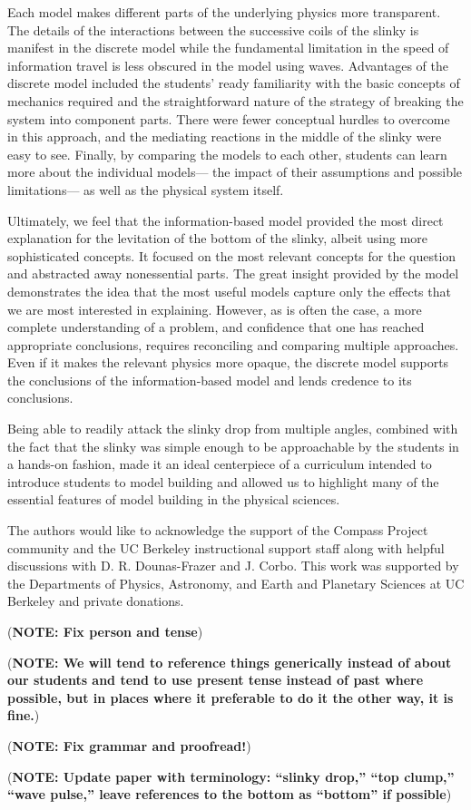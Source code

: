 \documentclass[prb,preprint,superscriptaddress]{revtex4-1}
\newcommand{\NOTE}[1]{\marginpar{\footnotesize\textbf{NOTE}} (\textbf{NOTE: #1})}
\begin{document}
Each model makes different parts of the underlying physics
more transparent. The details of the interactions between the successive coils
of the slinky is manifest in the discrete model while the fundamental
limitation in the speed of information travel is less obscured in the model
using waves. Advantages of the discrete model included the students' ready
familiarity with the basic concepts of mechanics required and the straightforward
nature of the strategy of breaking the system into component parts. There were
fewer conceptual hurdles to overcome in this approach, and the mediating
reactions in the middle of the slinky were easy to see.  Finally, by comparing the models to each other, students can learn more about the individual models--- the impact of their assumptions and possible limitations--- as well as the physical system itself.

Ultimately, we feel that the information-based model provided the
most direct explanation for the levitation of the bottom of the slinky, albeit
using more sophisticated concepts. It focused
on the most relevant concepts for the question and abstracted away
nonessential parts. The great insight provided by the
model demonstrates the idea that the most useful models
capture only the effects that we are most interested in explaining. However, as is often the case, a more complete understanding of a problem, and confidence that one has reached appropriate conclusions, requires reconciling and comparing multiple approaches. Even if it makes the relevant physics more opaque, the discrete model supports the conclusions of the information-based model and lends credence to its conclusions.

Being able to readily attack the slinky drop from multiple angles, combined with
the fact that the slinky was simple enough to be approachable by the students
in a hands-on fashion, made it an ideal centerpiece of a curriculum intended to
introduce students to model building and allowed us to highlight many of the
essential features of model building in the physical sciences.


\acknowledgments The authors would like to acknowledge the support of the Compass
Project community and the UC Berkeley instructional support staff along with
helpful discussions with D. R. Dounas-Frazer and J. Corbo.
This work was supported by the Departments of Physics, Astronomy, and Earth and
Planetary Sciences at UC Berkeley and private donations.

\NOTE{Fix person and tense}

\NOTE{We will tend to reference things generically instead of about our students and tend to use present tense instead of past where possible, but in places where it preferable to do it the other way, it is fine.}

\NOTE{Fix grammar and proofread!}

\NOTE{Update paper with terminology: ``slinky drop,'' ``top clump,'' ``wave pulse,'' leave references to the bottom as ``bottom'' if possible}


\end{document}
